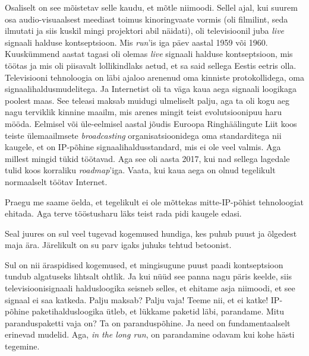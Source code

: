 Osaliselt on see mõistetav selle kaudu, et mõtle niimoodi. Sellel ajal, kui 
suurem osa audio-visuaalsest meediast toimus kinoringvaate vormis (oli 
filmilint, seda ilmutati ja siis kuskil mingi projektori abil näidati), oli  
televisioonil juba \emph{live}  signaali halduse kontseptsioon. Mis 
\emph{run}'is  iga päev aastal 1959 või 1960.  Kuuskümmend aastat tagasi oli 
olemas \emph{live} signaali halduse kontseptsioon, mis töötas ja mis oli 
piisavalt lollikindlaks  aetud, et sa said sellega Eestis eetris olla.  
Televisiooni tehnoloogia on läbi ajaloo arenenud oma kinniste protokollidega, 
oma signaalihaldusmudelitega. Ja Internetist oli ta väga kaua aega signaali 
loogikaga poolest  maas. See teleasi maksab muidugi ulmeliselt palju, aga 
ta oli kogu aeg nagu terviklik kinnine maailm, mis arenes mingit teist 
evolutsioonipuu haru mööda. Eelmisel või üle-eelmisel aastal jõudis Euroopa 
Ringhäälingute Liit koos teiste ülemaailmsete \emph{broadcasting} 
organisatsioonidega  oma standarditega nii kaugele, et on IP-põhine 
signaalihaldusstandard, mis ei ole veel valmis. Aga millest mingid tükid 
töötavad.  Aga see oli aasta 2017, kui nad sellega lagedale tulid koos 
korraliku \emph{roadmap}'iga. Vaata, kui kaua aega on olnud tegelikult 
normaalselt töötav Internet.

Praegu me saame öelda, et tegelikult ei ole mõttekas mitte-IP-põhist 
tehnoloogiat ehitada. Aga  terve tööstusharu läks teist rada pidi  kaugele 
edasi.


Seal juures on sul veel tugevad kogemused hundiga, kes puhub puust ja õlgedest 
maja ära. Järelikult on su parv igaks juhuks tehtud betoonist. 

Sul on nii äraspidised kogemused, et mingisugune puust paadi kontseptsioon 
tundub  algatuseks lihtsalt  ohtlik. Ja kui nüüd see panna nagu päris 
keelde, siis televisioonisignaali haldusloogika seisneb selles, et ehitame 
asja niimoodi, et see signaal ei saa katkeda. Palju maksab? Palju vaja! Teeme 
nii, et ei katke! IP-põhine paketihaldusloogika ütleb, et lükkame paketid läbi, 
parandame. Mitu paranduspaketti vaja on? Ta on paranduspõhine. Ja need on 
fundamentaalselt erinevad mudelid. Aga,  \emph{in the long run}, on parandamine 
odavam kui kohe hästi tegemine.
